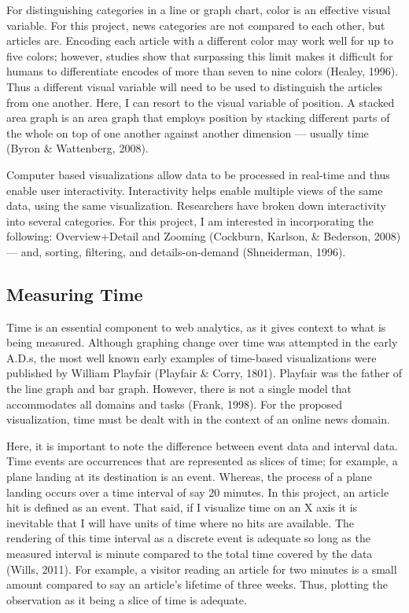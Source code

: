 \documentclass[12pt]{article}
\begin{document}
For distinguishing categories in a line or graph chart, color is an effective visual variable. For this project, news categories are not compared to each other, but articles are. Encoding each article with a different color may work well for up to five colors; however, studies show that surpassing this limit makes it difficult for humans to differentiate encodes of more than seven to nine colors (Healey, 1996). Thus a different visual variable will need to be used to distinguish the articles from one another. Here, I can resort to the visual variable of position. A stacked area graph is an area graph that employs position by stacking different parts of the whole on top of one another against another dimension --- usually time (Byron \& Wattenberg, 2008).  

Computer based visualizations allow data to be processed in real-time and thus enable user interactivity. Interactivity helps enable multiple views of the same data, using the same visualization. Researchers have broken down interactivity into several categories. For this project, I am interested in incorporating the following: Overview+Detail and Zooming (Cockburn, Karlson, \& Bederson, 2008) --- and, sorting, filtering, and details-on-demand (Shneiderman, 1996). 


\subsection{Measuring Time}
Time is an essential component to web analytics, as it gives context to what is being measured. Although graphing change over time was attempted in the early A.D.s, the most well known early examples of time-based visualizations were published by William Playfair (Playfair \& Corry, 1801). Playfair was the father of the line graph and bar graph. However, there is not a single model that accommodates all domains and tasks (Frank, 1998). For the proposed visualization, time must be dealt with in the context of an online news domain.   

Here, it is important to note the difference between event data and interval data. Time events are occurrences that are represented as slices of time; for example, a plane landing at its destination is an event. Whereas, the process of a plane landing occurs over a time interval of say 20 minutes. In this project, an article hit is defined as an event. That said, if I visualize time on an X axis it is inevitable that I will have units of time where no hits are available. The rendering of this time interval as a discrete event is adequate so long as the measured interval is minute compared to the total time covered by the data (Wills, 2011). For example, a visitor reading an article for two minutes is a small amount compared to say an article's lifetime of three weeks. Thus, plotting the observation as it being a slice of time is adequate.  
\end{document}
